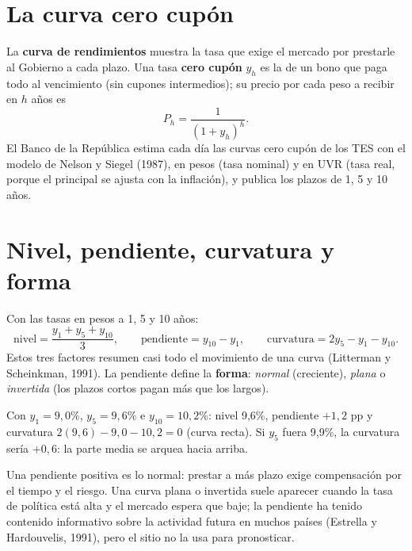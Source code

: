 \section{La curva cero cupón}
\label{es:f:curva}
La \textbf{curva de rendimientos} muestra la tasa que exige el mercado por prestarle al Gobierno a cada plazo. Una
tasa \textbf{cero cupón} $y_h$ es la de un bono que paga todo al vencimiento (sin cupones intermedios); su precio
por cada peso a recibir en $h$ años es
\[
P_h=\frac{1}{(1+y_h)^h}.
\]
El Banco de la República estima cada día las curvas cero cupón de los TES con el modelo de Nelson y Siegel (1987),
en pesos (tasa nominal) y en UVR (tasa real, porque el principal se ajusta con la inflación), y publica los plazos de
1, 5 y 10 años.

\section{Nivel, pendiente, curvatura y forma}
\label{es:f:factores}
Con las tasas en pesos a 1, 5 y 10 años:
\[
\text{nivel}=\frac{y_1+y_5+y_{10}}{3},\qquad \text{pendiente}=y_{10}-y_1,\qquad
\text{curvatura}=2y_5-y_1-y_{10}.
\]
Estos tres factores resumen casi todo el movimiento de una curva (Litterman y Scheinkman, 1991). La pendiente define la
\textbf{forma}: \emph{normal} (creciente), \emph{plana} o \emph{invertida} (los plazos cortos pagan más que los
largos).

\begin{dato}
Con $y_1=9{,}0\%$, $y_5=9{,}6\%$ e $y_{10}=10{,}2\%$: nivel 9,6\%, pendiente $+1{,}2$ pp y curvatura
$2(9{,}6)-9{,}0-10{,}2=0$ (curva recta). Si $y_5$ fuera 9,9\%, la curvatura sería $+0{,}6$: la parte media se arquea
hacia arriba.
\end{dato}

\begin{leer}
Una pendiente positiva es lo normal: prestar a más plazo exige compensación por el tiempo y el riesgo. Una curva plana
o invertida suele aparecer cuando la tasa de política está alta y el mercado espera que baje; la pendiente ha tenido
contenido informativo sobre la actividad futura en muchos países (Estrella y Hardouvelis, 1991), pero el sitio no la
usa para pronosticar.
\end{leer}

